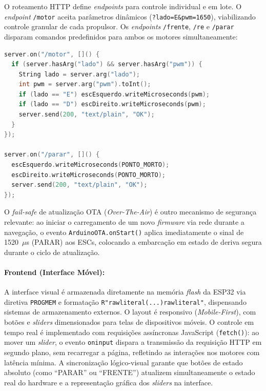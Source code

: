 \documentclass[12pt,a4paper]{article}
\begin{document}
O roteamento HTTP define \textit{endpoints} para controle individual e em lote. O \textit{endpoint} \texttt{/motor} aceita parâmetros dinâmicos (\texttt{?lado=E\&pwm=1650}), viabilizando controle granular de cada propulsor. Os \textit{endpoints} \texttt{/frente}, \texttt{/re} e \texttt{/parar} disparam comandos predefinidos para ambos os motores simultaneamente:

\begin{lstlisting}[language=C++, caption={Rota de controle individual por motor via parâmetros HTTP.}, label=lst:rota_motor]
server.on("/motor", []() {
  if (server.hasArg("lado") && server.hasArg("pwm")) {
    String lado = server.arg("lado");
    int pwm = server.arg("pwm").toInt();
    if (lado == "E") escEsquerdo.writeMicroseconds(pwm);
    if (lado == "D") escDireito.writeMicroseconds(pwm);
    server.send(200, "text/plain", "OK");
  }
});

server.on("/parar", []() {
  escEsquerdo.writeMicroseconds(PONTO_MORTO);
  escDireito.writeMicroseconds(PONTO_MORTO);
  server.send(200, "text/plain", "OK");
});
\end{lstlisting}

O \textit{fail-safe} de atualização OTA (\textit{Over-The-Air}) é outro mecanismo de segurança relevante: ao iniciar o carregamento de um novo \textit{firmware} via rede durante a navegação, o evento \texttt{ArduinoOTA.onStart()} aplica imediatamente o sinal de 1520~$\mu$s (PARAR) aos ESCs, colocando a embarcação em estado de deriva segura durante o ciclo de atualização.

\paragraph{Frontend (Interface Móvel):} A interface visual é armazenada diretamente na memória \textit{flash} da ESP32 via diretiva \texttt{PROGMEM} e formatação \texttt{R"rawliteral(...)rawliteral"}, dispensando sistemas de armazenamento externos. O layout é responsivo (\textit{Mobile-First}), com botões e \textit{sliders} dimensionados para telas de dispositivos móveis. O controle em tempo real é implementado com requisições assíncronas JavaScript (\texttt{fetch()}): ao mover um \textit{slider}, o evento \texttt{oninput} dispara a transmissão da requisição HTTP em segundo plano, sem recarregar a página, refletindo as interações nos motores com latência mínima. A sincronização lógico-visual garante que botões de estado absoluto (como ``PARAR'' ou ``FRENTE'') atualizem simultaneamente o estado real do hardware e a representação gráfica dos \textit{sliders} na interface.
\end{document}
